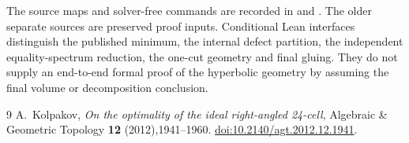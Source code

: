 \documentclass[11pt]{article}
\theoremstyle{remark}
\begin{document}
The source maps and solver-free commands are recorded in
 and
. The older separate sources are
preserved proof inputs. Conditional Lean interfaces distinguish the
published minimum, the internal defect partition, the independent
equality-spectrum reduction, the one-cut geometry and final gluing.
They do not supply an end-to-end formal proof of the hyperbolic
geometry by assuming the final volume or decomposition conclusion.

\begin{thebibliography}{9}
A.~Kolpakov, \emph{On the optimality of the ideal right-angled 24-cell},
Algebraic \& Geometric Topology \textbf{12} (2012),1941--1960.
\href{https://doi.org/10.2140/agt.2012.12.1941}{doi:10.2140/agt.2012.12.1941}.
\end{thebibliography}
\end{document}
